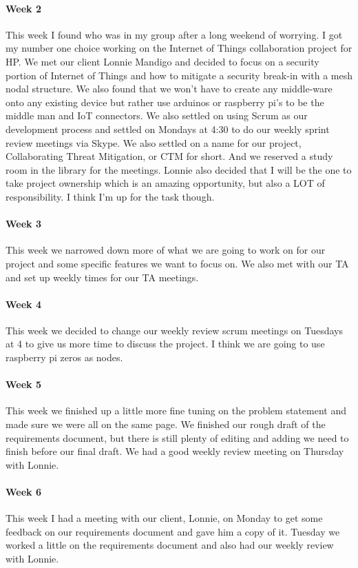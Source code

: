 \documentclass[draftclsnofoot, onecolumn, compsoc, 10pt]{IEEEtran}
\begin{document}
\paragraph{Week 2}
This week I found who was in my group after a long weekend of worrying. I got my number one choice working on the Internet of Things collaboration project for HP.  We met our client Lonnie Mandigo and decided to focus on a security portion of Internet of Things and how to mitigate a security break-in with a mesh nodal structure.  We also found that we won't have to create any middle-ware onto any existing device but rather use arduinos or raspberry pi's to be the middle man and IoT connectors. We also settled on using Scrum as our development process and settled on Mondays at 4:30 to do our weekly sprint review meetings via Skype.  We also settled on a name for our project, Collaborating Threat Mitigation, or CTM for short.  And we reserved a study room in the library for the meetings. Lonnie also decided that I will be the one to take project ownership which is an amazing opportunity, but also a LOT of responsibility. I think I'm up for the task though. 
\paragraph{Week 3}
This week we narrowed down more of what we are going to work on for our project and some specific features we want to focus on. We also met with our TA and set up weekly times for our TA meetings. 
\paragraph{Week 4}
This week we decided to change our weekly review scrum meetings on Tuesdays at 4 to give us more time to discuss the project. I think we are going to use raspberry pi zeros as nodes.   
\paragraph{Week 5}
This week we finished up a little more fine tuning on the problem statement and made sure we were all on the same page. We finished our rough draft of the requirements document, but there is still plenty of editing and adding we need to finish before our final draft. We had a good weekly review meeting on Thursday with Lonnie.
\paragraph{Week 6}
This week I had a meeting with our client, Lonnie, on Monday to get some feedback on our requirements document and gave him a copy of it.  
Tuesday we worked a little on the requirements document and also had our weekly review with Lonnie.  
\end{document}
